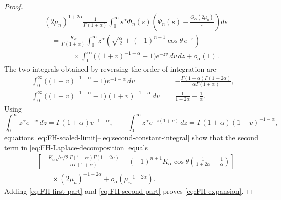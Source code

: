 \documentclass[10pt,a4paper]{amsart}
\begin{document}
\begin{proof}
\begin{equation}\label{eq:FH-scaled-limit}
 \begin{aligned}
 &(2\mu_n)^{1+2\alpha}
 \frac1{\Gamma(1+\alpha)}\int_0^\infty
 s^\alpha\Phi_n(s)
 \left(\Psi_n(s)-\frac{G_\alpha(2\mu_n)}s\right)ds\\
 &\quad=\frac{K_\alpha}{\Gamma(1+\alpha)}
 \int_0^\infty z^\alpha
 \left(\sqrt{\frac\alpha2}
 +(-1)^{n+1}\cos\theta\,e^{-z}\right)\\
 &\qquad\qquad\times\int_0^\infty
 \bigl((1+v)^{-1-\alpha}-1\bigr)e^{-zv}\,dv\,dz
 +o_\alpha(1).
 \end{aligned}
\end{equation}
The two integrals obtained by reversing the order of integration are
\begin{align}
 \int_0^\infty\bigl((1+v)^{-1-\alpha}-1\bigr)v^{-1-\alpha}\,dv
 &=-\frac{\Gamma(1-\alpha)\Gamma(1+2\alpha)}
 {\alpha\Gamma(1+\alpha)},
 \label{eq:first-constant-integral}\\
 \int_0^\infty\bigl((1+v)^{-1-\alpha}-1\bigr)
 (1+v)^{-1-\alpha}\,dv
 &=\frac1{1+2\alpha}-\frac1\alpha.
 \label{eq:second-constant-integral}
\end{align}
Using
\[
 \int_0^\infty z^\alpha e^{-zv}\,dz
 =\Gamma(1+\alpha)v^{-1-\alpha},
 \qquad
 \int_0^\infty z^\alpha e^{-z(1+v)}\,dz
 =\Gamma(1+\alpha)(1+v)^{-1-\alpha},
\]
equations \eqref{eq:FH-scaled-limit}--\eqref{eq:second-constant-integral}
show that the second term in \eqref{eq:FH-Laplace-decomposition} equals
\begin{equation}\label{eq:FH-second-part}
 \begin{aligned}
 &\left[-\frac{K_\alpha\sqrt{\alpha/2}\,
 \Gamma(1-\alpha)\Gamma(1+2\alpha)}
 {\alpha\Gamma(1+\alpha)}
 +(-1)^{n+1}K_\alpha\cos\theta
 \left(\frac1{1+2\alpha}-\frac1\alpha\right)\right]\\
 &\qquad\times(2\mu_n)^{-1-2\alpha}
 +o_\alpha(\mu_n^{-1-2\alpha}).
 \end{aligned}
\end{equation}
Adding \eqref{eq:FH-first-part} and \eqref{eq:FH-second-part} proves
\eqref{eq:FH-expansion}.


\end{proof}
\end{document}
